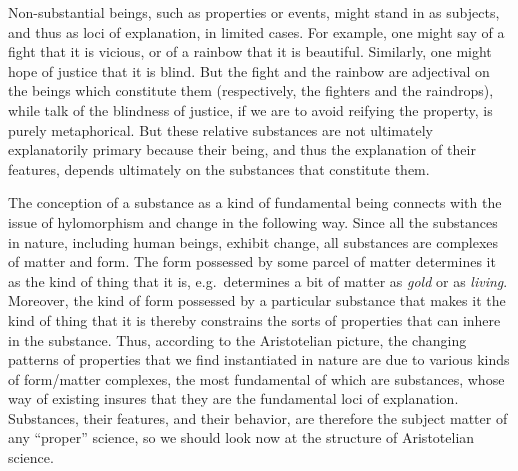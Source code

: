 \documentclass[12pt]{article}
\begin{document}
Non-substantial beings, such as properties or events, might stand in as subjects, and
thus as loci of explanation, in limited cases. For example, one might say of a fight
that it is vicious, or of a rainbow that it is beautiful. Similarly, one might hope
of justice that it is blind. But the fight and the rainbow are adjectival on the
beings which constitute them (respectively, the fighters and the raindrops), while
talk of the blindness of justice, if we are to avoid reifying the property, is purely
metaphorical. But these relative substances are not ultimately explanatorily primary
because their being, and thus the explanation of their features, depends ultimately
on the substances that constitute them.

The conception of a substance as a kind of fundamental being connects with the issue
of hylomorphism and change in the following way. Since all the substances in nature,
including human beings, exhibit change, all substances are complexes of matter and
form. The form possessed by some parcel of matter determines it as the kind of thing
that it is, e.g. determines a bit of matter as \emph{gold} or as \emph{living}. Moreover, the kind
of form possessed by a particular substance that makes it the kind of thing that it
is thereby constrains the sorts of properties that can inhere in the substance. Thus,
according to the Aristotelian picture, the changing patterns of properties that we
find instantiated in nature are due to various kinds of form/matter complexes, the
most fundamental of which are substances, whose way of existing insures that they are
the fundamental loci of explanation. Substances, their features, and their behavior,
are therefore the subject matter of any ``proper'' science, so we should look now at the
structure of Aristotelian science.
\end{document}
